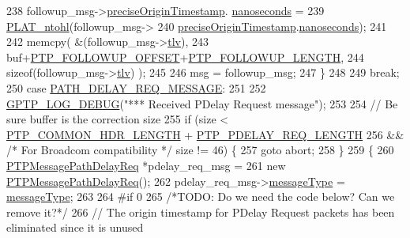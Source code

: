 \begin{DoxyCode}
{{{{{{238             followup\_msg->\hyperlink{class_p_t_p_message_follow_up_ab410646215c0bcbaf124d5923f22e2ca}{preciseOriginTimestamp}.
      \hyperlink{class_timestamp_a78ae11d98fcfe738239d0a853d82c84a}{nanoseconds} =
239                 \hyperlink{linux_2src_2platform_8cpp_ad335681c3444e0406899693a6f782173}{PLAT\_ntohl}(followup\_msg->
240                        \hyperlink{class_p_t_p_message_follow_up_ab410646215c0bcbaf124d5923f22e2ca}{preciseOriginTimestamp}.\hyperlink{class_timestamp_a78ae11d98fcfe738239d0a853d82c84a}{nanoseconds});
241 
242             memcpy( &(followup\_msg->\hyperlink{class_p_t_p_message_follow_up_adb3aa00a5c7072f30af7374ea54c158c}{tlv}),
243                 buf+\hyperlink{avbts__message_8hpp_af54dd338e8c2b906b028746fbecdb74d}{PTP\_FOLLOWUP\_OFFSET}+\hyperlink{avbts__message_8hpp_a7db8f880133691145b633e681fea9d27}{PTP\_FOLLOWUP\_LENGTH},
244                 \textcolor{keyword}{sizeof}(followup\_msg->\hyperlink{class_p_t_p_message_follow_up_adb3aa00a5c7072f30af7374ea54c158c}{tlv}) );
245 
246             msg = followup\_msg;
247         \}
248 
249         \textcolor{keywordflow}{break};
250     \textcolor{keywordflow}{case} \hyperlink{avbts__message_8hpp_ac6606ebe91c8ac66a2c314c79f5ab013ac4aa576969ecdd82afe82721e94ba36f}{PATH\_DELAY\_REQ\_MESSAGE}:
251 
252         \hyperlink{gptp__log_8hpp_ae4c6efe7c9cf6d7d3bbd28a0fd087d61}{GPTP\_LOG\_DEBUG}(\textcolor{stringliteral}{"*** Received PDelay Request message"});
253 
254         \textcolor{comment}{// Be sure buffer is the correction size}
255         \textcolor{keywordflow}{if} (size < \hyperlink{avbts__message_8hpp_a8ec4d965b7b1e83844f1c17f12e9b8e4}{PTP\_COMMON\_HDR\_LENGTH} + 
      \hyperlink{avbts__message_8hpp_a7116d339377bcb1fbb2f4276aa9b3f70}{PTP\_PDELAY\_REQ\_LENGTH}
256             && \textcolor{comment}{/* For Broadcom compatibility */} size != 46) \{
257             \textcolor{keywordflow}{goto} abort;
258         \}
259         \{
260             \hyperlink{class_p_t_p_message_path_delay_req}{PTPMessagePathDelayReq} *pdelay\_req\_msg =
261                 \textcolor{keyword}{new} \hyperlink{class_p_t_p_message_path_delay_req}{PTPMessagePathDelayReq}();
262             pdelay\_req\_msg->\hyperlink{class_p_t_p_message_common_adb32627aa5b0e2dbad3ccd88aab07c05}{messageType} = \hyperlink{class_p_t_p_message_common_adb32627aa5b0e2dbad3ccd88aab07c05}{messageType};
263 
264 \textcolor{preprocessor}{#if 0}
265             \textcolor{comment}{/*TODO: Do we need the code below? Can we remove it?*/}
266             \textcolor{comment}{// The origin timestamp for PDelay Request packets has been eliminated since it is unused}
}}}}}}
\end{DoxyCode}

